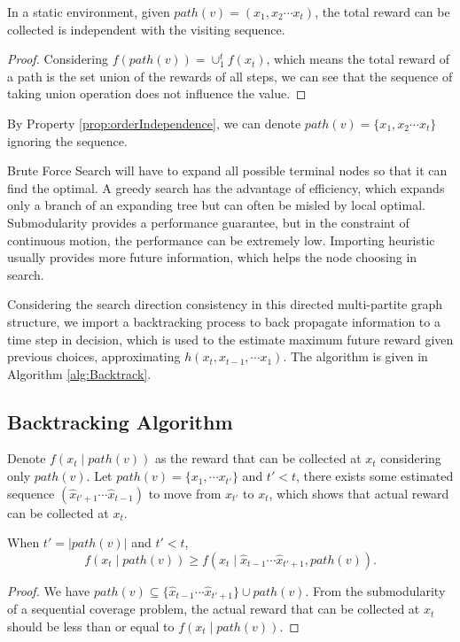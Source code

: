 \documentclass[12pt]{article}
\begin{document}
\begin{propty}
\label{prop:orderIndependence}
In a static environment, given $ path(v) = ( x_{1}, x_{2} \cdots x_{t} ) $, the total reward can be collected is independent with the visiting sequence.
\begin{proof}
Considering $ f(path(v)) = \cup_{1}^{t} f(x_{t}) $, which means the total reward of a path is the set union of the rewards of all steps, we can see that the sequence of taking union operation does not influence the value.
\end{proof}
\end{propty}

By Property \ref{prop:orderIndependence}, we can denote $ path(v) = \{ x_{1}, x_{2} \cdots x_{t} \} $ ignoring the sequence.

Brute Force Search will have to expand all possible terminal nodes so that it can find the optimal. A greedy search has the advantage of efficiency, which expands only a branch of an expanding tree but can often be misled by local optimal. Submodularity provides a performance guarantee, but in the constraint of continuous motion, the performance can be extremely low. Importing heuristic usually provides more future information, which helps the node choosing in search.

Considering the search direction consistency in this directed multi-partite graph structure, we import a backtracking process to back propagate information to a time step in decision, which is used to the estimate maximum future reward given previous choices, approximating $ h(x_{t},  x_{t-1}, \cdots x_{1}) $. The algorithm is given in Algorithm \ref{alg:Backtrack}.

\subsection{Backtracking Algorithm}

Denote $ f(x_{t} \mid path(v)) $ as the reward that can be collected at $ x_{t} $ considering only $ path(v) $. Let  $ path(v) = \{x_{1}, \cdots x_{t'}\} $ and $ t' < t $, there exists some estimated sequence $ ( \hat{x}_{t'+1} \cdots \hat{x}_{t-1} ) $ to move from $ x_{t'} $ to $ x_{t} $, which shows that actual reward can be collected at $ x_{t} $.

\begin{lem}
\label{lem:submod}
When $ t' = \left| path(v) \right| $ and $ t' < t $, 
\begin{equation}
f(x_{t} \mid path(v)) \geq f(x_{t} \mid \hat{x}_{t-1} \cdots \hat{x}_{t'+1}, path(v) ).
\end{equation}
\begin{proof}
We have $ path(v) \subseteq \{ \hat{x}_{t-1} \cdots \hat{x}_{t'+1} \} \cup path(v) $. From the submodularity of a sequential coverage problem, the actual reward that can be collected at $ x_{t} $ should be less than or equal to $ f(x_{t} \mid path(v)) $. 
\end{proof}
\end{lem}
\end{document}
